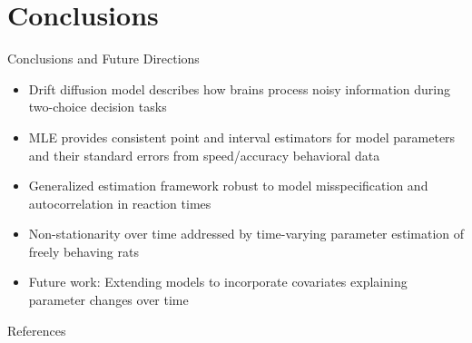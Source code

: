 \documentclass[8pt]{beamer}
\begin{document}
\section{Conclusions}

\begin{frame}{Conclusions and Future Directions}
    \begin{itemize}
        \item Drift diffusion model describes how brains process noisy information during two-choice decision tasks \vspace{0.25cm}

        \item MLE provides consistent point and interval estimators for model parameters and their standard errors from speed/accuracy behavioral data \vspace{0.25cm}

        \item Generalized estimation framework robust to model misspecification and autocorrelation in reaction times \vspace{0.25cm}

        \item Non-stationarity over time addressed by time-varying parameter estimation of freely behaving rats \vspace{0.25cm}

        \item Future work: Extending models to incorporate covariates explaining parameter changes over time
    \end{itemize}
\end{frame}

\begin{frame}{References}
    \small
    
\end{frame}
\end{document}
